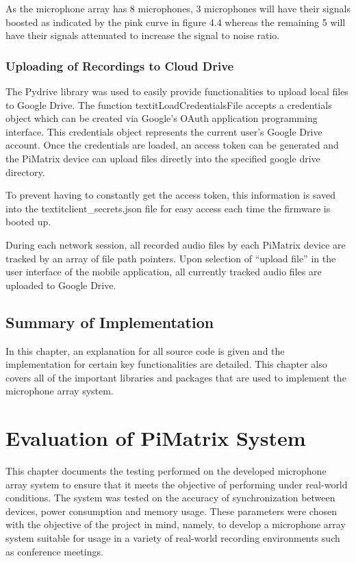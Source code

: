 \documentclass[hidelinks,12pt]{report} %
\begin{document}
As the microphone array has 8 microphones, 3 microphones will have their signals boosted as indicated by the pink curve in figure 4.4 whereas the remaining 5 will have their signals attenuated to increase the signal to noise ratio. 

\subsection{Uploading of Recordings to Cloud Drive}

The Pydrive library was used to easily provide functionalities to upload local files to Google Drive. The function textit{LoadCredentialsFile} accepts a credentials object which can be created via Google’s OAuth application programming interface. This credentials object represents the current user’s Google Drive account. Once the credentials are loaded, an access token can be generated and the PiMatrix device can upload files directly into the specified google drive directory.

To prevent having to constantly get the access token, this information is saved into the textit{client\_secrets.json} file for easy access each time the firmware is booted up. 

During each network session, all recorded audio files by each PiMatrix device are tracked by an array of file path pointers. Upon selection of “upload file” in the user interface of the mobile application, all currently tracked audio files are uploaded to Google Drive. 



\section{Summary of Implementation}

In this chapter, an explanation for all source code is given and the implementation for certain key functionalities are detailed. This chapter also covers all of the important libraries and packages that are used to implement the microphone array system. 

\chapter{Evaluation of PiMatrix System}

This chapter documents the testing performed on the developed microphone array system to ensure that it meets the objective of performing under real-world conditions. The system was tested on the accuracy of synchronization between devices, power consumption and memory usage. These parameters were chosen with the objective of the project in mind, namely, to develop a microphone array system suitable for usage in a variety of real-world recording environments such as conference meetings. 
\end{document}
